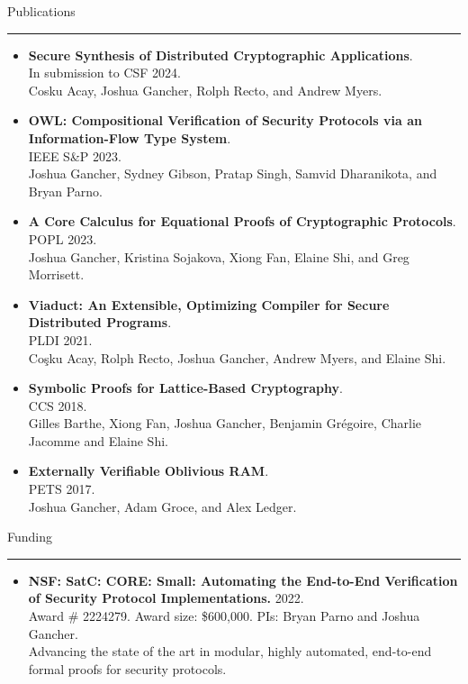 \documentclass{article}
\newcommand{\rsection}[1]{\vspace{1em} {\huge #1} \vspace{0.5em} \hrule \vspace{1em}}
\begin{document}
\rsection{Publications}
\begin{itemize}[leftmargin=*]
    \item {\bf Secure Synthesis of Distributed Cryptographic Applications}. \\
        In submission to CSF 2024. \\ 
        Cosku Acay, Joshua Gancher, Rolph Recto, and Andrew Myers.
    \item {\bf OWL: Compositional Verification of Security Protocols
        via an Information-Flow Type System}. \\ IEEE S\&P 2023. \\
    Joshua Gancher, Sydney Gibson, Pratap Singh, Samvid Dharanikota, and Bryan
        Parno.
    \item {\bf A Core Calculus for Equational Proofs of Cryptographic
        Protocols}. \\ POPL 2023. \\ Joshua Gancher, Kristina Sojakova, Xiong Fan,
        Elaine Shi, and Greg Morrisett.  
    \item {\bf Viaduct: An Extensible, Optimizing Compiler for Secure
        Distributed Programs}. \\ PLDI 2021.
        \\
        Coşku Acay, Rolph Recto, Joshua Gancher, Andrew Myers, and Elaine Shi.
    \item \textbf{Symbolic Proofs for Lattice-Based Cryptography}. \\ CCS 2018. 
        \\
    {Gilles Barthe, Xiong Fan, Joshua Gancher, Benjamin Grégoire, Charlie Jacomme and Elaine Shi.}
    \item \textbf{Externally Verifiable Oblivious RAM}. \\ PETS 2017.
        \\
    Joshua Gancher, Adam Groce, and Alex Ledger.
\end{itemize}

\rsection{Funding}
 \begin{itemize}[leftmargin=*]
     \item {\bf NSF: SatC: CORE: Small: Automating the End-to-End Verification
         of Security Protocol Implementations.} 2022.
         \\
         Award \# 2224279. Award size: \$600,000. PIs: Bryan Parno and Joshua
         Gancher.
         \\
         Advancing the state of the art in modular, highly automated, end-to-end formal
         proofs for security protocols. 
 \end{itemize}
\end{document}
